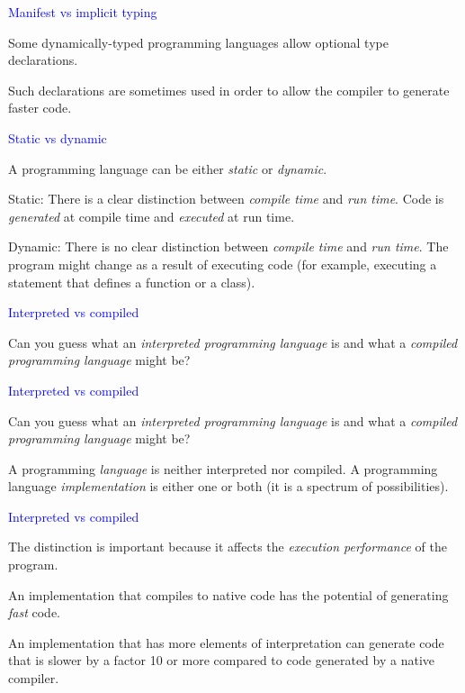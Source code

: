 \documentclass{slides}
\newcommand{\ti}[1]{\begin{center}\Large{\textcolor{blue}{#1}}\end{center}}
\begin{document}
\begin{slide}\ti{Manifest vs implicit typing}

Some dynamically-typed programming languages allow optional type
declarations.

Such declarations are sometimes used in order to allow the compiler to
generate faster code.

\vfill\end{slide}
\begin{slide}\ti{Static vs dynamic}

A programming language can be either \emph{static} or \emph{dynamic}.

Static: There is a clear distinction between \emph{compile time} and
\emph{run time}.  Code is \emph{generated} at compile time and
\emph{executed} at run time.

Dynamic: There is no clear distinction between \emph{compile time} and
\emph{run time}.  The program might change as a result of executing
code (for example, executing a statement that defines a function or a
class).

\vfill\end{slide}
\begin{slide}\ti{Interpreted vs compiled}

Can you guess what an \emph{interpreted programming language} is and
what a \emph{compiled programming language} might be?

\vfill\end{slide}
\begin{slide}\ti{Interpreted vs compiled}

Can you guess what an \emph{interpreted programming language} is and
what a \emph{compiled programming language} might be?

A programming \emph{language} is neither interpreted nor compiled.  A
programming language \emph{implementation} is either one or both (it
is a spectrum of possibilities).

\vfill\end{slide}
\begin{slide}\ti{Interpreted vs compiled}

The distinction is important because it affects the \emph{execution
  performance} of the program.

An implementation that compiles to native code has the potential of
generating \emph{fast} code.

An implementation that has more elements of interpretation can
generate code that is slower by a factor 10 or more compared to code
generated by a native compiler.

\vfill\end{slide}
\end{document}
